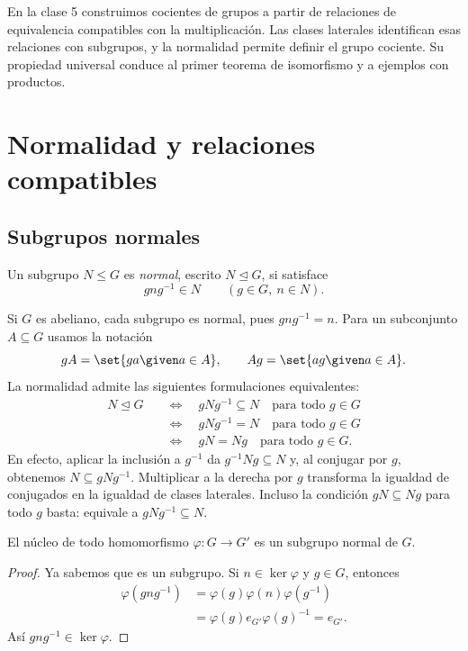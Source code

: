 En la clase 5 construimos cocientes de grupos a partir de relaciones de equivalencia compatibles con la multiplicación. Las clases laterales identifican esas relaciones con subgrupos, y la normalidad permite definir el grupo cociente. Su propiedad universal conduce al primer teorema de isomorfismo y a ejemplos con productos.

\section{Normalidad y relaciones compatibles}
\subsection{Subgrupos normales}
\begin{defi}
Un subgrupo $N\le G$ es \emph{normal}, escrito $N\trianglelefteq G$, si satisface
\[
gng^{-1}\in N\qquad(g\in G,\ n\in N).
\]
\end{defi}
Si $G$ es abeliano, cada subgrupo es normal, pues $gng^{-1}=n$. Para un subconjunto $A\subseteq G$ usamos la notación
\[
gA=\set{ga\given a\in A},\qquad
Ag=\set{ag\given a\in A}.
\]
La normalidad admite las siguientes formulaciones equivalentes:
\begin{align*}
N\trianglelefteq G
&\quad\Longleftrightarrow\quad gNg^{-1}\subseteq N\quad\text{para todo }g\in G\\
&\quad\Longleftrightarrow\quad gNg^{-1}=N\quad\text{para todo }g\in G\\
&\quad\Longleftrightarrow\quad gN=Ng\quad\text{para todo }g\in G.
\end{align*}
En efecto, aplicar la inclusión a $g^{-1}$ da $g^{-1}Ng\subseteq N$ y, al conjugar por $g$, obtenemos $N\subseteq gNg^{-1}$. Multiplicar a la derecha por $g$ transforma la igualdad de conjugados en la igualdad de clases laterales. Incluso la condición $gN\subseteq Ng$ para todo $g$ basta: equivale a $gNg^{-1}\subseteq N$.

\begin{lema}\label{lema:C5-nucleo-normal}
El núcleo de todo homomorfismo $\varphi:G\to G'$ es un subgrupo normal de $G$.
\end{lema}
\begin{proof}
Ya sabemos que es un subgrupo. Si $n\in\ker\varphi$ y $g\in G$, entonces
\begin{align*}
\varphi(gng^{-1})
&=\varphi(g)\varphi(n)\varphi(g^{-1})\\
&=\varphi(g)e_{G'}\varphi(g)^{-1}=e_{G'}.
\end{align*}
Así $gng^{-1}\in\ker\varphi$.
\end{proof}

